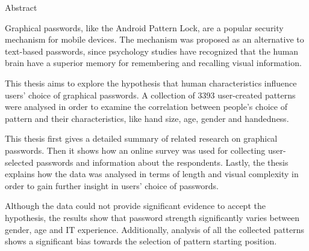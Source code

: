 
{\centering 

	{\Huge Abstract}

	\vspace{1cm}
	
	Graphical passwords, like the Android Pattern Lock, are a popular security mechanism for mobile devices. The mechanism was proposed as an alternative to text-based passwords, since psychology studies have recognized that the human brain have a superior memory for remembering and recalling visual information.

	This thesis aims to explore the hypothesis that human characteristics influence users’ choice of graphical passwords. A collection of 3393 user-created patterns were analysed in order to examine the correlation between people’s choice of pattern and their characteristics, like hand size, age, gender and handedness.

	This thesis first gives a detailed summary of related research on graphical passwords. Then it shows how an online survey was used for collecting user-selected passwords and information about the respondents. Lastly, the thesis explains how the data was analysed in terms of length and visual complexity in order to gain further insight in users’ choice of passwords.

	Although the data could not provide significant evidence to accept the hypothesis, the results show that password strength significantly varies between gender, age and IT experience. Additionally, analysis of all the collected patterns shows a significant bias towards the selection of pattern starting position.


}

\clearpage


